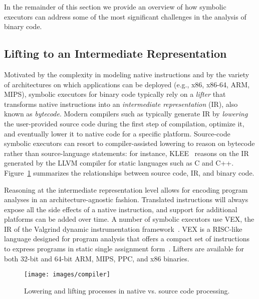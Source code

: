 In the remainder of this section we provide an overview of how symbolic executors can address some of the most significant challenges in the analysis of binary code.

\subsection{Lifting to an Intermediate Representation}
Motivated by the complexity in modeling native instructions and by the variety of architectures on which applications can be deployed (e.g., x86, x86-64, ARM, MIPS), symbolic executors for binary code typically rely on a {\em lifter} that transforms native instructions into an {\em intermediate representation} (IR), also known as {\em bytecode}. Modern compilers such as  typically generate IR by {\em lowering} the user-provided source code during the first step of compilation, optimize it, and eventually lower it to native code for a specific platform. Source-code symbolic executors can resort to compiler-assisted lowering to reason on bytecode rather than source-language statements: for instance, {\sc KLEE}~\cite{KLEE-OSDI08} reasons on the IR generated by the LLVM compiler for static languages such as C and C++. Figure~\ref{fig:lowering} summarizes the relationships between source code, IR, and binary code. %

Reasoning at the intermediate representation level allows for encoding program analyses in an architecture-agnostic fashion. Translated instructions will always expose all the side effects of a native instruction, and support for additional platforms can be added over time. A number of symbolic executors use VEX, the IR of the Valgrind dynamic instrumentation framework~\cite{VALGRIND-PLDI07}. VEX is a RISC-like language designed for program analysis that offers a compact set of instructions to express programs in static single assignment form~\cite{SSA-TOPLAS91}. Lifters are available for both 32-bit and 64-bit ARM, MIPS, PPC, and x86 binaries.

\begin{figure}[t!]
  \centering
  \texttt{[image: images/compiler]} %
  \vspace{-2mm}
  \caption{\label{fig:lowering} Lowering and lifting processes in native vs. source code processing.}
  \vspace{-1mm} %
\end{figure}

